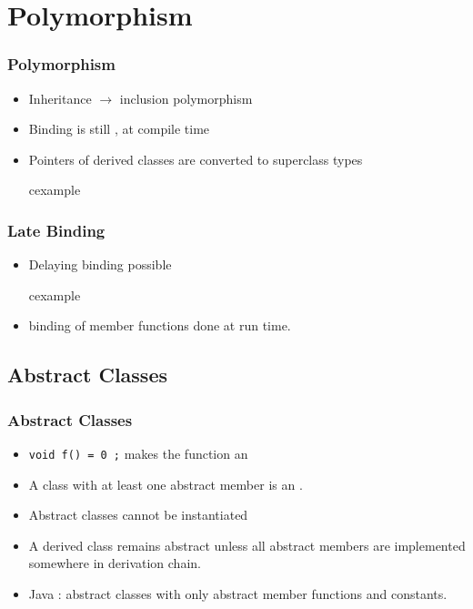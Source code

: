 \section{Polymorphism}
\begin{frame}
\frametitle{Polymorphism}
\begin{itemize}
	\item Inheritance $\rightarrow$ inclusion polymorphism
	\item Binding is still , at compile time
	\item Pointers of derived classes are converted to superclass types
\begin{beamercolorbox}{cexample}
\codePolyStatic
\end{beamercolorbox}
\end{itemize}
\end{frame}

\begin{frame}
\frametitle{Late Binding}
\begin{itemize}
	\item Delaying binding possible
\begin{beamercolorbox}{cexample}
\codePolyLate
\end{beamercolorbox}
	\item binding of  member functions done at run time.
\end{itemize}
\end{frame}

\subsection{Abstract Classes}
\begin{frame}
\frametitle{Abstract Classes}
\begin{itemize}
\item	\lstinline!void f() = 0 ;! makes the function an 
\item A class with at least one abstract member is an .
\item Abstract classes cannot be instantiated
\item A derived class remains abstract unless all abstract members are implemented somewhere in derivation chain.
\item Java : abstract classes with only abstract member functions and constants.
\end{itemize}
\end{frame}


